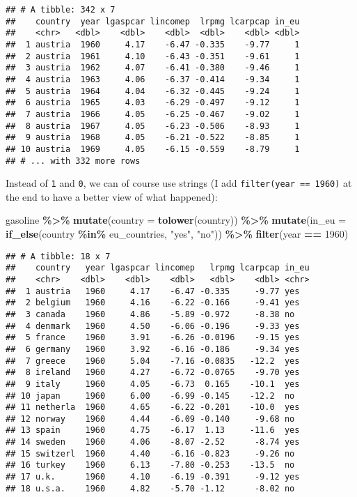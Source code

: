 \documentclass[
]{article}
\newenvironment{Shaded}{\begin{snugshade}}{\end{snugshade}}
\newcommand{\DataTypeTok}[1]{\textcolor[rgb]{0.13,0.29,0.53}{#1}}
\newcommand{\DecValTok}[1]{\textcolor[rgb]{0.00,0.00,0.81}{#1}}
\newcommand{\KeywordTok}[1]{\textcolor[rgb]{0.13,0.29,0.53}{\textbf{#1}}}
\newcommand{\NormalTok}[1]{#1}
\newcommand{\OperatorTok}[1]{\textcolor[rgb]{0.81,0.36,0.00}{\textbf{#1}}}
\newcommand{\StringTok}[1]{\textcolor[rgb]{0.31,0.60,0.02}{#1}}
\begin{document}
\begin{verbatim}
## # A tibble: 342 x 7
##    country  year lgaspcar lincomep  lrpmg lcarpcap in_eu
##    <chr>   <dbl>    <dbl>    <dbl>  <dbl>    <dbl> <dbl>
##  1 austria  1960     4.17    -6.47 -0.335    -9.77     1
##  2 austria  1961     4.10    -6.43 -0.351    -9.61     1
##  3 austria  1962     4.07    -6.41 -0.380    -9.46     1
##  4 austria  1963     4.06    -6.37 -0.414    -9.34     1
##  5 austria  1964     4.04    -6.32 -0.445    -9.24     1
##  6 austria  1965     4.03    -6.29 -0.497    -9.12     1
##  7 austria  1966     4.05    -6.25 -0.467    -9.02     1
##  8 austria  1967     4.05    -6.23 -0.506    -8.93     1
##  9 austria  1968     4.05    -6.21 -0.522    -8.85     1
## 10 austria  1969     4.05    -6.15 -0.559    -8.79     1
## # ... with 332 more rows
\end{verbatim}

Instead of \texttt{1} and \texttt{0}, we can of course use strings (I add \texttt{filter(year\ ==\ 1960)} at the end to
have a better view of what happened):

\begin{Shaded}
\begin{Highlighting}[]
\NormalTok{gasoline }\OperatorTok{\%\textgreater{}\%}
\StringTok{  }\KeywordTok{mutate}\NormalTok{(}\DataTypeTok{country =} \KeywordTok{tolower}\NormalTok{(country)) }\OperatorTok{\%\textgreater{}\%}
\StringTok{  }\KeywordTok{mutate}\NormalTok{(}\DataTypeTok{in\_eu =} \KeywordTok{if\_else}\NormalTok{(country }\OperatorTok{\%in\%}\StringTok{ }\NormalTok{eu\_countries, }\StringTok{"yes"}\NormalTok{, }\StringTok{"no"}\NormalTok{)) }\OperatorTok{\%\textgreater{}\%}
\StringTok{  }\KeywordTok{filter}\NormalTok{(year }\OperatorTok{==}\StringTok{ }\DecValTok{1960}\NormalTok{)}
\end{Highlighting}
\end{Shaded}

\begin{verbatim}
## # A tibble: 18 x 7
##    country   year lgaspcar lincomep   lrpmg lcarpcap in_eu
##    <chr>    <dbl>    <dbl>    <dbl>   <dbl>    <dbl> <chr>
##  1 austria   1960     4.17    -6.47 -0.335     -9.77 yes  
##  2 belgium   1960     4.16    -6.22 -0.166     -9.41 yes  
##  3 canada    1960     4.86    -5.89 -0.972     -8.38 no   
##  4 denmark   1960     4.50    -6.06 -0.196     -9.33 yes  
##  5 france    1960     3.91    -6.26 -0.0196    -9.15 yes  
##  6 germany   1960     3.92    -6.16 -0.186     -9.34 yes  
##  7 greece    1960     5.04    -7.16 -0.0835   -12.2  yes  
##  8 ireland   1960     4.27    -6.72 -0.0765    -9.70 yes  
##  9 italy     1960     4.05    -6.73  0.165    -10.1  yes  
## 10 japan     1960     6.00    -6.99 -0.145    -12.2  no   
## 11 netherla  1960     4.65    -6.22 -0.201    -10.0  yes  
## 12 norway    1960     4.44    -6.09 -0.140     -9.68 no   
## 13 spain     1960     4.75    -6.17  1.13     -11.6  yes  
## 14 sweden    1960     4.06    -8.07 -2.52      -8.74 yes  
## 15 switzerl  1960     4.40    -6.16 -0.823     -9.26 no   
## 16 turkey    1960     6.13    -7.80 -0.253    -13.5  no   
## 17 u.k.      1960     4.10    -6.19 -0.391     -9.12 yes  
## 18 u.s.a.    1960     4.82    -5.70 -1.12      -8.02 no
\end{verbatim}
\end{document}
